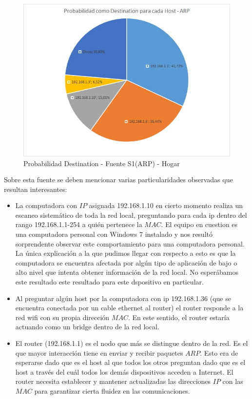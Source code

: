 \begin{figure}[h!]
\centering
\includegraphics[scale=0.7]{./img/proba_dst_casa.jpg}
\caption{Probabilidad Destination - Fuente S1(ARP) - Hogar}
\end{figure}
\newpage

Sobre esta fuente se deben mencionar varias particularidades observadas que resultan interesantes:

\begin{itemize}
\item{La computadora con $IP$ asignada 192.168.1.10 en cierto momento realiza un escaneo sistemático de toda la red local, preguntando 
para cada ip dentro del rango 192.168.1.1-254 a quién pertenece la $MAC$. El equipo en cuestion es una computadora personal con Windows 7 instalado 
y nos resultó sorprendente observar este comportamiento para una computadora personal. 
La única explicación a la que pudimos llegar con respecto a esto es que la computadora se encuentra afectada por algún tipo de aplicación 
de bajo o alto nivel que intenta obtener información de la red local. No esperábamos este resultado este resultado para este dspositivo en particular.}

\item{Al preguntar algún host por la computadora con ip 192.168.1.36 (que se encuentra conectada por un cable ethernet al router) 
el router responde a la red wifi con su propia dirección $MAC$. En este sentido, el router estaría actuando como un bridge dentro de la red local.}

\item{El router (192.168.1.1) es el nodo que más se distingue dentro de la red. Es el que mayor interacción tiene en enviar y recibir 
paquetes $ARP$. Esto era de esperarse dado que es el host al que todos los otros preguntan dado que es el host a través del cuál 
todos los demás dispositivos acceden a Internet. El router necesita establecer y mantener actualizadas las direcciones $IP$ con las $MAC$ para
garantizar cierta fluidez en las comunicaciones.}

\end{itemize}

